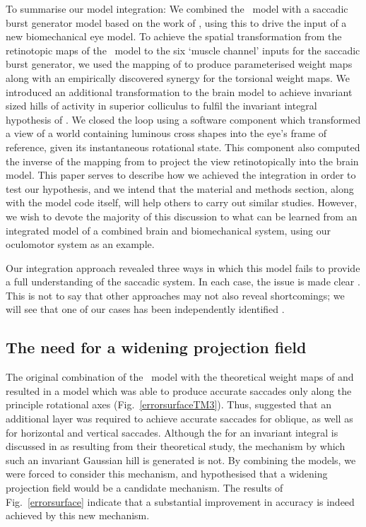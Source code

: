 \documentclass{frontiersSCNS}
\begin{document}
To summarise our model integration: We combined
the \ccg~model \citep{cope_basal_2017} with a saccadic burst generator
model based on the work of \cite{gancarz_neural_1998}, using this to
drive the input of a new biomechanical eye model. To achieve the spatial
transformation from the retinotopic maps of the \ccg~model to the six
`muscle channel' inputs for the saccadic burst generator, we used
the mapping of \cite{ottes_visuomotor_1986} to produce parameterised
weight maps along with an empirically discovered synergy for the torsional
weight maps. We introduced an additional
transformation to the brain model to achieve invariant sized hills of
activity in superior colliculus to fulfil the invariant integral
hypothesis of \cite{tabareau_geometry_2007}. We closed the loop using
a software component which transformed a view of a world containing
luminous cross shapes into the eye's frame of reference, given its
instantaneous rotational state. This component also computed the inverse
of the mapping from \cite{ottes_visuomotor_1986} to project the view
retinotopically into the brain model.
%
This paper serves to describe how we achieved the integration in
order to test our hypothesis, and we intend that the material and
methods section, along with the model code itself, will help others
to carry out similar studies. However, we wish to devote the majority
of this discussion to what can be learned from an integrated model
of a combined brain and biomechanical system, using our oculomotor system
as an example.

Our integration approach revealed three ways in which this model fails
to provide a full understanding of the saccadic system. In each case,
the issue is made clear . This is not
to say that other approaches may not also reveal shortcomings; we will
see that one of our cases has been independently identified
\citep{groh_effects_2011}.

\subsection{The need for a widening projection field}

The original combination of the \ccg~model with the theoretical weight
maps of \cite{ottes_visuomotor_1986} and \cite{tabareau_geometry_2007}
resulted in a model which was
able to produce accurate saccades only along the principle rotational
axes (Fig.~\ref{errorsurfaceTM3}). Thus,  suggested that an additional
layer was required to achieve accurate saccades for oblique, as well
as for horizontal and vertical saccades. Although the  for an
invariant integral is discussed in \cite{tabareau_geometry_2007} as resulting from
their theoretical study, the mechanism by which such an invariant
Gaussian hill is generated is not. By combining the models, we were
forced to consider this mechanism, and hypothesised that a widening
projection field would be a candidate mechanism. The results of
Fig.~\ref{errorsurface} indicate that a substantial improvement
in accuracy is indeed achieved by this new mechanism.
\end{document}
